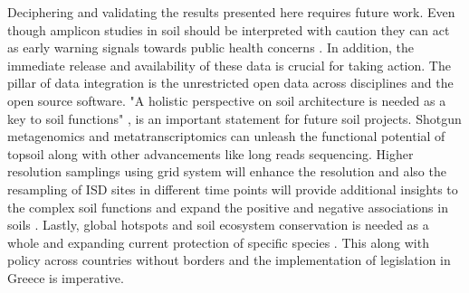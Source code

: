 Deciphering and validating the results presented here requires future work.
Even though amplicon studies in soil should be interpreted with caution \parencite{alteio2021} they 
can act as early warning signals towards public health concerns \parencite{banerjee2023Soil}.
In addition, the immediate release and availability of these data is crucial for 
taking action.
The pillar of data integration is the unrestricted open data across disciplines and 
the open source software.
"A holistic perspective on soil architecture is needed as a key to soil functions" \parencite{philippot2024the-interplay}, is 
an important statement for future soil projects.
Shotgun metagenomics and metatranscriptomics can unleash the functional potential of
topsoil along with other advancements like long reads sequencing. Higher resolution
samplings using grid system will enhance the resolution and also the resampling of
ISD sites in different time points will provide additional insights to the complex soil 
functions and expand the positive and negative associations in soils \parencite{Liu2024}.
Lastly, global hotspots \parencite{Guerra2022} and soil ecosystem conservation is needed as 
a whole and expanding current protection of specific species \parencite{guerra2021tracking}.
This along with policy \parencite{KONINGER2022} across countries \parencite{Putten2023}
without borders and the implementation of legislation in Greece \parencite{SCHISMENOS2022100035} is 
imperative.


